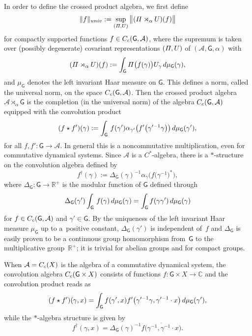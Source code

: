 \documentclass[11pt]{article}
\numberwithin{equation}{section}
\numberwithin{equation}{section}
\def\dd{{\rm d}}
\newcommand{\sfG}{\mathsf{G}}
\newcommand{\Pim}{{\mit\Pi}}
\newcommand{\complex}{{\mathbb C}} %
\newcommand{\real}{{\mathbb R}} %
\def\alg{{\mathcal A}}
\begin{document}
In order to define the crossed product
algebra, we first define
\[
\|f\|_{\rm univ} := \sup_{({\mit\Pi},U)} \big\|({\mit\Pi}\rtimes_\alpha U)(f)\big\|
\]
for compactly supported functions $f\in C_{\rm c}(\sfG,\alg) $, where the supremum is taken
over (possibly degenerate) covariant representations
$({\mit\Pi},U)$ of $(\alg, \sfG, \alpha)$ with
\[
(\Pim\rtimes_\alpha U)(f) := \int_\sfG
\Pim\big(f(\gamma)\big) U_\gamma\, \dd\mu_\sfG(\gamma) ,
\]
and $\mu_\sfG$ denotes the left invariant Haar measure on $\sfG$. This defines a norm, called the universal norm, on the
space $C_{\rm c}(\sfG,\alg)$.
Then the crossed product algebra $\alg\rtimes_\alpha \sfG$ is the
completion (in the universal norm) of the algebra $C_{\rm c}(\sfG,\alg)$
equipped with the convolution product
\begin{gather}\label{eq:convproduct}
(f\star f')(\gamma) := \int_\sfG\, f(\gamma') \alpha_{\gamma'}\big(f'\big(\gamma'^{-1} \gamma\big)\big)\, \dd \mu_\sfG(\gamma')
,
\end{gather}
for all $f,f'\colon \sfG\to\alg$. In general this is a noncommutative
multiplication, even for commutative dynamical systems.
Since $\alg$ is a $C^*$-algebra, there is a $*$-structure on the
convolution algebra defined by
\[
f^\dag(\gamma):= \Delta_\sfG(\gamma)^{-1} \alpha_\gamma\big(f\big(\gamma^{-1}\big)^*\big) ,
\]
where $\Delta_\sfG\colon \sfG\to \real^+$ is the modular function of
$\sfG$ defined through
\[
\Delta_\sfG(\gamma')
\int_\sfG\,f(\gamma)\,\dd\mu_\sfG(\gamma)=\int_\sfG f(\gamma \gamma')\,\dd\mu_\sfG(\gamma)
\]
for $f\in C_{\rm c}(\sfG,\alg)$ and $\gamma'\in \sfG$. By the uniqueness of the left
invariant Haar measure $\mu_\sfG$ up to a~positive
constant, $\Delta_\sfG(\gamma')$ is independent of~$f$
and $\Delta_\sfG$ is easily proven to be a continuous group homomorphism from~$\sfG$ to the
multiplicative group~$\real^+$; it is trivial for abelian groups and for compact
groups.

When $\alg=C_{\rm c}(X)$
is the algebra of a commutative dynamical system, the convolution
algebra $C_{\rm c}(\sfG\times X)$ consists of functions $f\colon\sfG\times X\to\complex$ and the
convolution product reads as
\[
(f\star f')(\gamma,x) = \int_\sfG f(\gamma',x)
f'\big(\gamma'^{-1} \gamma,\gamma'^{-1}\cdot x\big)\, \dd \mu_\sfG(\gamma') ,
\]
while the $*$-algebra structure is given by
\[
f^\dag(\gamma,x) = \Delta_\sfG(\gamma)^{-1} \overline{f\big(\gamma^{-1},\gamma^{-1}\cdot x\big)} .
\]
\end{document}
